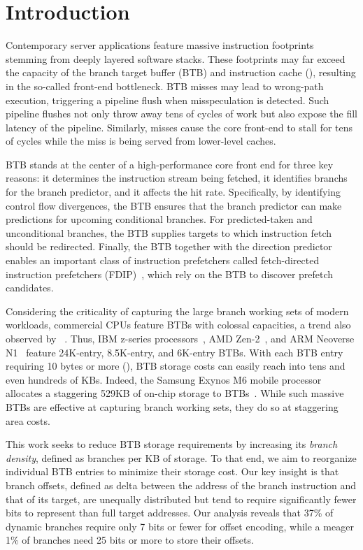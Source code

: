 \section{Introduction}
\label{cal:sec::intro}

Contemporary server applications feature massive instruction footprints stemming from deeply layered software stacks. These footprints may far exceed the capacity of the branch target buffer (BTB) and instruction cache (), resulting in the so-called front-end bottleneck. BTB misses may lead to wrong-path execution, triggering a pipeline flush when misspeculation is detected. Such pipeline flushes not only throw away tens of cycles of work but also expose the fill latency of the pipeline. Similarly,  misses cause the core front-end to stall for tens of cycles while the miss is being served from lower-level caches. 

BTB stands at the center of a high-performance core front end for three key reasons: it determines the instruction stream being fetched, it identifies branchs for the branch predictor, and it affects the  hit rate. Specifically, by identifying control flow divergences, the BTB ensures that the branch predictor can make predictions for upcoming conditional branches. For predicted-taken and unconditional branches, the BTB supplies targets to which instruction fetch should be redirected. Finally, the BTB together with the direction predictor enables an important class of instruction prefetchers called fetch-directed instruction prefetchers (FDIP)~\cite{fdip, boomerang, shotgun}, which rely on the BTB to discover  prefetch candidates. 

Considering the criticality of capturing the large branch working sets of modern workloads, commercial CPUs feature BTBs with colossal capacities, a trend also observed by ~\cite{rebase}. Thus, IBM z-series processors~\cite{IBMz}, AMD Zen-2~\cite{zen2}, and ARM Neoverse N1~\cite{neoverse} feature 24K-entry, 8.5K-entry, and 6K-entry BTBs. With each BTB entry requiring 10 bytes or more (), BTB storage costs can easily reach into tens and even hundreds of KBs. Indeed, the Samsung Exynos M6 mobile processor allocates a staggering 529KB of on-chip storage to BTBs~\cite{exynos}. While such massive BTBs are effective at capturing branch working sets, they do so at staggering area costs.

This work seeks to reduce BTB storage requirements by increasing its {\em branch density}, defined as branches per KB of storage. To that end, we aim to reorganize individual BTB entries to minimize their storage cost. Our key insight is that branch offsets, defined as delta between the address of the branch instruction and that of its target, are unequally distributed but tend to require significantly fewer bits to represent than full target addresses. Our analysis reveals that 37\% of dynamic branches require only 7 bits or fewer for offset encoding, while a meager 1\% of branches need 25 bits or more to store their offsets. 

